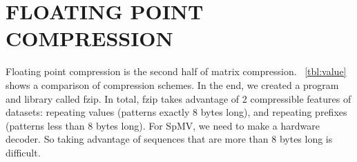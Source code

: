 \chapter{FLOATING POINT COMPRESSION}
\label{chp:fzip}
\newif\ifshort

\shorttrue

\newif\ifbwtsec

\bwtsecfalse
Floating point compression is the second half of matrix compression. \figurename~\ref{tbl:value} shows a comparison of compression schemes. In the end, we created a program and library called fzip. In total, fzip takes advantage of 2 compressible features of datasets: repeating values (patterns exactly 8 bytes long), and repeating prefixes (patterns less than 8 bytes long). For SpMV, we need to make a hardware decoder. So taking advantage of sequences that are more than 8 bytes long is difficult.
